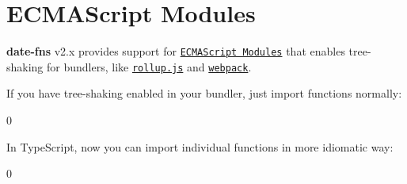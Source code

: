 \chapter{ECMAScript Modules }
\hypertarget{md_frontend_2node__modules_2date-fns_2docs_2esm}{}\label{md_frontend_2node__modules_2date-fns_2docs_2esm}
\label{md_frontend_2node__modules_2date-fns_2docs_2esm_autotoc_md6328}%
%


{\bfseries{date-\/fns}} v2.\+x provides support for \href{http://www.ecma-international.org/ecma-262/6.0/\#sec-modules}{\texttt{ECMAScript Modules}} that enables tree-\/shaking for bundlers, like \href{http://rollupjs.org}{\texttt{rollup.\+js}} and \href{https://webpack.js.org}{\texttt{webpack}}.

If you have tree-\/shaking enabled in your bundler, just import functions normally:\+


\begin{DoxyCode}{0}

\end{DoxyCode}


In Type\+Script, now you can import individual functions in more idiomatic way:\+


\begin{DoxyCode}{0}
\DoxyCodeLine{}

\end{DoxyCode}
 